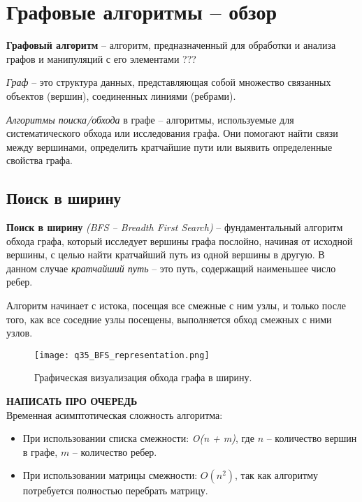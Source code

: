 \section{Графовые алгоритмы – обзор}

\textbf{Графовый алгоритм}  -- алгоритм, предназначенный для обработки и анализа графов и манипуляций с его элементами ???

\textit{Граф} -- это структура данных, представляющая собой множество связанных объектов (вершин), соединенных линиями (ребрами).
\vspace{10pt}

\textit{Алгоритмы поиска/обхода} в графе -- алгоритмы, используемые для систематического обхода или исследования графа. Они помогают найти связи между вершинами, определить кратчайшие пути или выявить определенные свойства графа.

\subsection{Поиск в ширину}
\textbf{Поиск в ширину} \textit{(BFS -- Breadth First Search)} -- фундаментальный алгоритм обхода графа, который исследует вершины графа послойно, начиная от исходной вершины, с целью найти кратчайший путь из одной вершины в другую. В данном случае \textit{кратчайший путь} -- это путь, содержащий наименьшее число ребер.

Алгоритм начинает с истока, посещая все смежные с ним узлы, и только после того, как все соседние узлы посещены, выполняется обход смежных с ними узлов.

\begin{figure}[htbp]
	\centering
	\texttt{[image: q35\_BFS\_representation.png]}
	\caption{Графическая визуализация обхода графа в ширину.}
\end{figure}

{\LARGE \textbf{НАПИСАТЬ ПРО ОЧЕРЕДЬ}}
\\[5mm]

Временная асимптотическая сложность алгоритма: 
\begin{itemize}[label=$\triangleright$, font=\scriptsize, noitemsep, topsep=0pt, , partopsep=0pt]
	\item {\footnotesize При использовании списка смежности: \textit{O(n + m)}, где $n$ -- количество вершин в графе, $m$ -- количество ребер.}
	\item {\footnotesize При использовании матрицы смежности: \textit{$O(n^{2})$}, так как алгоритму потребуется полностью перебрать матрицу.}
\end{itemize}
\vspace{5pt}

